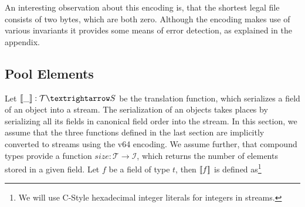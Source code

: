 An interesting observation about this encoding is, that the shortest legal file consists of two bytes, which are both zero. Although the encoding makes use of various invariants it provides some means of error detection, as explained in the appendix.

\subsection{Pool Elements}

Let $\den{\_}:\mathcal{T} → S$ be the translation function, which serializes a field of an object into a stream. The serialization of an objects takes places by serializing all its fields in canonical field order into the stream. In this section, we assume that the three functions defined in the last section are implicitly converted to streams using the v64 encoding. We assume further, that compound types provide a function $size: \mathcal{T} → \mathcal{I}$, which returns the number of elements stored in a given field.
Let $f$ be a field of type $t$, then $[\![f]\!]$ is defined as\footnote{We will use C-Style hexadecimal integer literals for integers in streams.}
